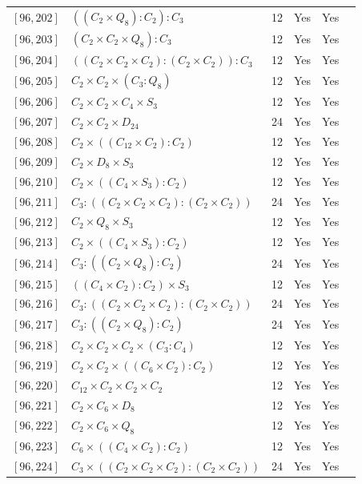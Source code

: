 \documentclass[12pt, a4paper]{article}
\theoremstyle{plain}
\theoremstyle{definition}
\begin{document}
\begin{longtable}{llcccl}
  $[96,202]$ & $((C_2 \times Q_8) : C_2) : C_3$ & 12 & Yes & Yes \\
  $[96,203]$ & $(C_2 \times C_2 \times Q_8) : C_3$ & 12 & Yes & Yes \\
  $[96,204]$ & $((C_2 \times C_2 \times C_2) : (C_2 \times C_2)) : C_3$ & 12 & Yes & Yes \\
  $[96,205]$ & $C_2 \times C_2 \times (C_3 : Q_8)$ & 12 & Yes & Yes \\
  $[96,206]$ & $C_2 \times C_2 \times C_4 \times S_3$ & 12 & Yes & Yes \\
  $[96,207]$ & $C_2 \times C_2 \times D_{24}$ & 24 & Yes & Yes \\
  $[96,208]$ & $C_2 \times ((C_{12} \times C_2) : C_2)$ & 12 & Yes & Yes \\
  $[96,209]$ & $C_2 \times D_8 \times S_3$ & 12 & Yes & Yes \\
  $[96,210]$ & $C_2 \times ((C_4 \times S_3) : C_2)$ & 12 & Yes & Yes \\
  $[96,211]$ & $C_3 : ((C_2 \times C_2 \times C_2) : (C_2 \times C_2))$ & 24 & Yes & Yes \\
  $[96,212]$ & $C_2 \times Q_8 \times S_3$ & 12 & Yes & Yes \\
  $[96,213]$ & $C_2 \times ((C_4 \times S_3) : C_2)$ & 12 & Yes & Yes \\
  $[96,214]$ & $C_3 : ((C_2 \times Q_8) : C_2)$ & 24 & Yes & Yes \\
  $[96,215]$ & $((C_4 \times C_2) : C_2) \times S_3$ & 12 & Yes & Yes \\
  $[96,216]$ & $C_3 : ((C_2 \times C_2 \times C_2) : (C_2 \times C_2))$ & 24 & Yes & Yes \\
  $[96,217]$ & $C_3 : ((C_2 \times Q_8) : C_2)$ & 24 & Yes & Yes \\
  $[96,218]$ & $C_2 \times C_2 \times C_2 \times (C_3 : C_4)$ & 12 & Yes & Yes \\
  $[96,219]$ & $C_2 \times C_2 \times ((C_6 \times C_2) : C_2)$ & 12 & Yes & Yes \\
  $[96,220]$ & $C_{12} \times C_2 \times C_2 \times C_2$ & 12 & Yes & Yes \\
  $[96,221]$ & $C_2 \times C_6 \times D_8$ & 12 & Yes & Yes \\
  $[96,222]$ & $C_2 \times C_6 \times Q_8$ & 12 & Yes & Yes \\
  $[96,223]$ & $C_6 \times ((C_4 \times C_2) : C_2)$ & 12 & Yes & Yes \\
  $[96,224]$ & $C_3 \times ((C_2 \times C_2 \times C_2) : (C_2 \times C_2))$ & 24 & Yes & Yes \\

\end{longtable}
\end{document}
